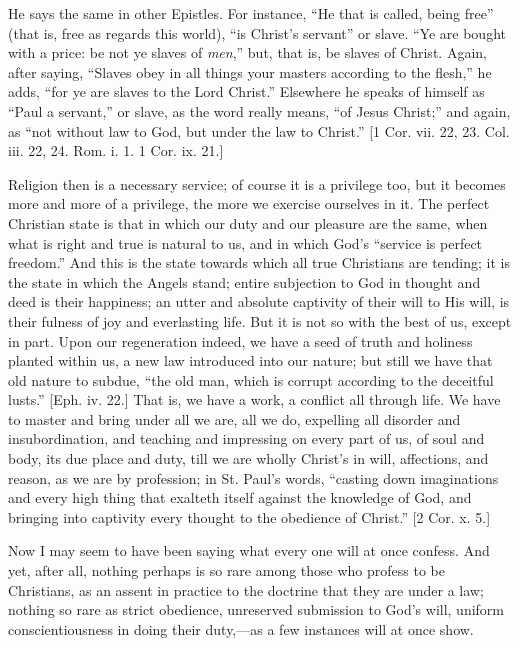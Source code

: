 He says the same in other Epistles. For instance, ``He that is
called, being free'' (that is, free as regards this world),
``is Christ's servant'' or slave. ``Ye are bought with a
price: be not ye slaves of \emph{men},'' but, that is, be slaves
of Christ. Again, after saying, ``Slaves obey in all things your
masters according to the flesh,'' he adds, ``for ye are slaves
to the Lord Christ.'' Elsewhere he speaks of himself as ``Paul
a servant,'' or slave, as the word really means, ``of Jesus
Christ;'' and again, as ``not without law to God, but under
the law to Christ.'' [1 Cor. vii. 22, 23. Col. iii. 22, 24. Rom. i.
1. 1 Cor. ix. 21.]

Religion then is a necessary service; of course it is a privilege
too, but it becomes more and more of a privilege, the more we exercise
ourselves in it. The perfect Christian state is that in which our duty
and our pleasure are the same, when what is right and true is natural
to us, and in which God's ``service is perfect freedom.'' And
this is the state towards which all true Christians are tending; it is
the state in which the Angels stand; entire subjection to God in
thought and deed is their happiness; an utter and absolute captivity
of their will to His will, is their fulness of joy and everlasting
life. But it is not so with the best of us, except in part. Upon our
regeneration indeed, we have a seed of truth and holiness planted
within us, a new law introduced into our nature; but still we have
that old nature to subdue, ``the old man, which is corrupt
according to the deceitful lusts.'' [Eph. iv. 22.] That is, we
have a work, a conflict all through life. We have to master and bring
under all we are, all we do, expelling all disorder and
insubordination, and teaching and impressing on every part of us, of
soul and body, its due place and duty, till we are wholly Christ's in
will, affections, and reason, as we are by profession; in St. Paul's
words, ``casting down imaginations and every high thing that
exalteth itself against the knowledge of God, and bringing into
captivity every thought to the obedience of Christ.'' [2 Cor. x.
5.]

Now I may seem to have been saying what every one will at once
confess. And yet, after all, nothing perhaps is so rare among those
who profess to be Christians, as an assent in practice to the doctrine
that they are under a law; nothing so rare as strict obedience,
unreserved submission to God's will, uniform conscientiousness in
doing their duty,—as a few instances will at once show.

